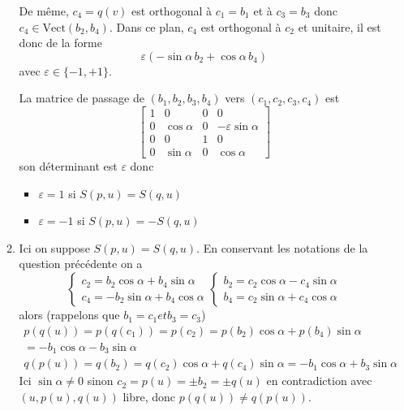 \begin{enumerate}
\begin{enumerate}
De même, $c_{4}=q(v)$ est orthogonal à $c_{1}=b_{1}$ et à $c_{3}=b_{3}$ donc $c_{4}\in \mathrm{Vect}(b_{2},b_{4})$. Dans ce plan, $c_{4}$ est orthogonal à $c_{2}$ et unitaire, il est donc de la forme 
\[\varepsilon (-\sin \alpha \,b_{2}+\cos \alpha \,b_{4})\]
avec $\varepsilon \in \{-1,+1\}$.

La matrice de passage de $(b_{1},b_{2},b_{3},b_{4})$ vers $(c_{1},c_{2},c_{3},c_{4})$ est
\[\left [
\begin{array}{cccc}
1& 0 & 0 & 0\\
0 & \cos \alpha & 0& -\varepsilon \sin \alpha\\
0 & 0 & 1 & 0\\
0 & \sin \alpha & 0 &\cos \alpha
\end{array}
\right ]
\]
son déterminant est $\varepsilon$ donc \begin{itemize}
\item $\varepsilon=1$ si $S(p,u)=S(q,u)$
\item $\varepsilon=-1$ si $S(p,u)=-S(q,u)$
\end{itemize}
\item Ici on suppose $S(p,u)=S(q,u)$. En conservant les notations de la question précédente on a 
\[\left \{ \begin{array}{c} 
c_{2}=b_{2} \cos \alpha+b_{4}\sin\alpha\\
c_{4}=-b_{2}\sin \alpha +b_{4}\cos\alpha\end{array}\right.
\left \{ \begin{array}{c} 
b_{2}=c_{2} \cos \alpha-c_{4}\sin\alpha\\
b_{4}=c_{2}\sin \alpha +c_{4}\cos\alpha\end{array}\right.\]
alors (rappelons que $b_{1}=c_{1} et b_{3}=c_{3}$)
\begin{eqnarray*}
p(q(u))= p(q(c_{1}))=p(c_{2})= p(b_{2}) \cos \alpha+ p(b_{4})\sin\alpha \\
= -b_{1}\cos\alpha - b_{3} \sin \alpha\\
q(p(u))= q(b_{2})= q(c_{2}) \cos \alpha+ q(c_{4})\sin\alpha= -b_{1}\cos\alpha + b_{3} \sin \alpha
\end{eqnarray*}
Ici $\sin \alpha \neq 0$ sinon $c_{2}=p(u)=\pm b_{2}=\pm q(u)$ en contradiction avec $(u,p(u),q(u))$ libre, donc $p(q(u))\neq q(p(u))$.


\end{enumerate}
\end{enumerate}

